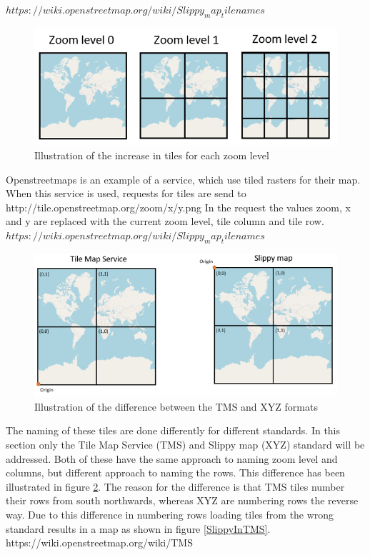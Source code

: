 $https://wiki.openstreetmap.org/wiki/Slippy_map_tilenames$


\begin{figure} [H]
	\centering
	\includegraphics[width=.8\textwidth]{Pictures/TilesPerZoomLevel}
	\caption{Illustration of the increase in tiles for each zoom level}
	\label{TilesPerZoomLevel}
\end{figure}

Openstreetmaps is an example of a service, which use tiled rasters for their map. When this service is used, requests for tiles are send to 
http://tile.openstreetmap.org/zoom/x/y.png
In the request the values zoom, x and y are replaced with the current zoom level, tile column and tile row.
$https://wiki.openstreetmap.org/wiki/Slippy_map_tilenames$

\begin{figure} [H]
	\centering
	\includegraphics[width=.8\textwidth]{Pictures/TMSXYZ}
	\caption{Illustration of the difference between the TMS and XYZ formats}
	\label{TMSXYZ}
\end{figure}


The naming of these tiles are done differently for different standards. In this section only the Tile Map Service (TMS) and Slippy map (XYZ) standard will be addressed. Both of these have the same approach to naming zoom level and columns, but different approach to naming the rows. This difference has been illustrated in figure \ref{TMSXYZ}. The reason for the difference is that TMS tiles number their rows from south northwards, whereas XYZ are numbering rows the reverse way. Due to this difference in numbering rows loading tiles from the wrong standard results in a map as shown in figure \ref{SlippyInTMS}.
https://wiki.openstreetmap.org/wiki/TMS 


